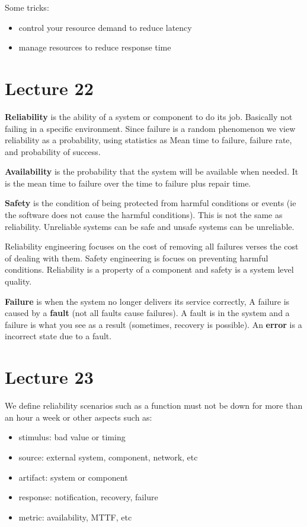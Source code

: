 \documentclass{article}
\begin{document}
Some tricks:
\begin{itemize}
    \item control your resource demand to reduce latency
    \item manage resources to reduce response time
\end{itemize}

\section*{Lecture 22} %
\label{sec:lecture_22}
\textbf{Reliability} is the ability of a system or component to do its job. Basically not failing in a specific environment. Since failure is a random phenomenon we view reliability as a probability, using statistics as Mean time to failure, failure rate, and probability of success.

\textbf{Availability} is the probability that the system will be available when needed. It is the mean time to failure over the time to failure plus repair time.

\textbf{Safety} is the condition of being protected from harmful conditions or events (ie the software does not cause the harmful conditions). This is not the same as reliability. Unreliable systems can be safe and unsafe systems can be unreliable.

Reliability engineering focuses on the cost of removing all failures verses the cost of dealing with them. Safety engineering is focues on preventing harmful conditions. Reliability is a property of a component and safety is a system level quality.

\textbf{Failure} is when the system no longer delivers its service correctly, A failure is caused by a \textbf{fault} (not all faults cause failures). A fault is in the system and a failure is what you see as a result (sometimes, recovery is possible). An \textbf{error} is a incorrect state due to a fault.

\section{Lecture 23} %
\label{sec:lecture_23}
We define reliability scenarios such as a function must not be down for more than an hour a week or other aspects such as:
\begin{itemize}
    \item stimulus: bad value or timing
    \item source: external system, component, network, etc
    \item artifact: system or component
    \item response: notification, recovery, failure
    \item metric: availability, MTTF, etc
\end{itemize}
\end{document}
